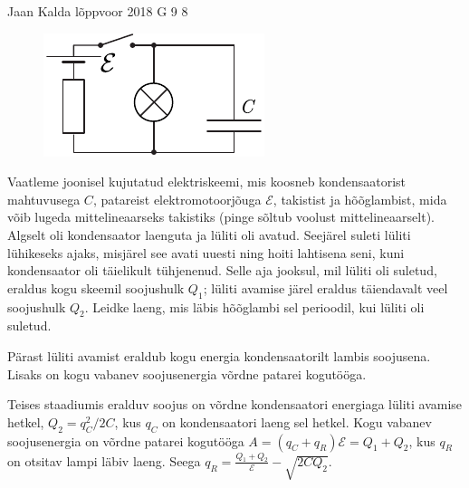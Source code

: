 {Jaan Kalda} %
{lõppvoor} %
{2018} %
{G 9} %
{8} %
{
\ifStatement
\begin{figure}
\vspace{-10pt}
\begin{center}
\includegraphics[width=\linewidth]{2018-v3g-09-LC-Q}
\par\end{center} 
\end{figure}

Vaatleme joonisel kujutatud elektriskeemi, mis koosneb kondensaatorist mahtuvusega $C$, patareist elektromotoorjõuga  $\mathcal{E}$, takistist ja hõõglambist, mida võib lugeda mittelineaarseks takistiks (pinge sõltub voolust mittelineaarselt). Algselt oli kondensaator laenguta ja lüliti oli avatud. Seejärel suleti lüliti lühikeseks ajaks, misjärel see avati uuesti ning hoiti lahtisena seni, kuni kondensaator oli täielikult tühjenenud. Selle aja jooksul, mil lüliti oli suletud, eraldus kogu skeemil soojushulk $Q_1$; lüliti avamise järel eraldus täiendavalt veel soojushulk $Q_2$. Leidke laeng, mis läbis hõõglambi sel perioodil, kui lüliti oli suletud.
\fi


\ifHint
Pärast lüliti avamist eraldub kogu energia kondensaatorilt lambis soojusena. Lisaks on kogu vabanev soojusenergia võrdne patarei kogutööga.
\fi


\ifSolution
Teises staadiumis eralduv soojus on võrdne kondensaatori energiaga lüliti avamise hetkel, $Q_2=q_C^2/2C$, kus $q_C$ on kondensaatori laeng sel hetkel. Kogu vabanev soojusenergia on võrdne patarei kogutööga $A=(q_C+q_R)\mathcal E=Q_1+Q_2$, kus $q_R$ on otsitav lampi läbiv laeng. Seega $q_R=\frac{Q_1+Q_2}{\mathcal E}-\sqrt{2CQ_2}$.
\fi


}
